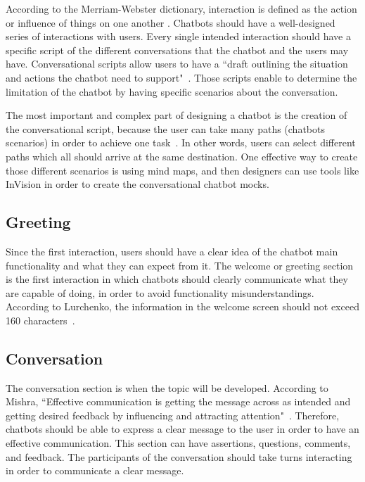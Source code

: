 \documentclass[a4paper,10pt]{article}
\begin{document}
According to the Merriam-Webster dictionary, interaction is defined as the action or influence of things on one another \cite{merriam-webster}.
Chatbots should have a well-designed series of interactions with users. Every single intended interaction should have a specific script of the different conversations that the chatbot and the users may have. Conversational scripts allow users to have a ``draft outlining the situation and actions the chatbot need to support"~\cite{CaseStudy}. Those scripts enable to determine the limitation of the chatbot by having specific scenarios about the conversation. 

The most important and complex part of designing a chatbot is the creation of the conversational script, because the user can take many paths (chatbots scenarios) in order to achieve one task~\cite{designChatbotConversatio}. In other words, users can select different paths which all should arrive at the same destination. One effective way to create those different scenarios is using mind maps, and then designers can use tools like InVision in order to create the conversational chatbot mocks.

\subsection{Greeting}
Since the first interaction, users should have a clear idea of the chatbot main functionality and what they can expect from it.
The welcome or greeting section is the first interaction in which chatbots should clearly communicate what they are capable of doing, in order to avoid functionality misunderstandings. According to Lurchenko, the information in the welcome screen should not exceed 160 characters~\cite{CheatSheet}. 

\subsection{Conversation}
The conversation section is when the topic will be developed. According to Mishra, ``Effective communication is getting the message across as intended and getting desired feedback by influencing and attracting attention"~\cite{effectivCommunication}. Therefore, chatbots should be able to express a clear message to the user in order to have an effective communication. This section can have assertions, questions, comments, and feedback. The participants of the conversation should take turns interacting in order to communicate a clear message.
\end{document}
